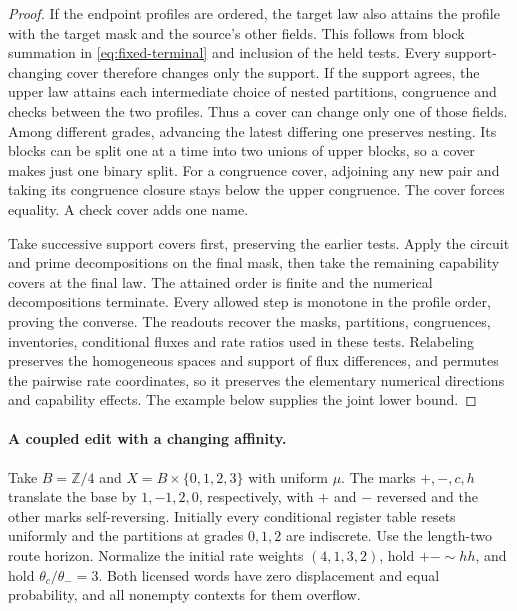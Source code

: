 \begin{proof}
If the endpoint profiles are ordered, the target law also attains
the profile with the target mask and the source's other fields.
This follows from block summation in \eqref{eq:fixed-terminal} and
inclusion of the held tests. Every support-changing cover therefore
changes only the support. If the support agrees, the upper law
attains each intermediate choice of nested partitions, congruence
and checks between the two profiles. Thus a cover can change only
one of those fields. Among different grades, advancing the latest
differing one preserves nesting. Its blocks can be split one at a
time into two unions of upper blocks, so a cover makes just one
binary split. For a congruence cover, adjoining any new pair and
taking its congruence closure stays below the upper congruence.
The cover forces equality. A check cover adds one name.

Take successive support covers first, preserving the earlier tests.
Apply the circuit and prime decompositions on the final mask, then
take the remaining capability covers at the final law. The attained
order is finite and the numerical decompositions terminate. Every
allowed step is monotone in the profile order, proving the converse.
The readouts recover the masks, partitions, congruences, inventories,
conditional fluxes and rate ratios used in these tests. Relabeling
preserves the homogeneous spaces and support of flux differences,
and permutes the pairwise rate coordinates, so it preserves the
elementary numerical directions and capability effects. The example
below supplies the joint lower bound.
\end{proof}

\paragraph{A coupled edit with a changing affinity.}
Take \(B=\mathbb Z/4\) and \(X=B\times\{0,1,2,3\}\) with uniform
\(\mu\). The marks \(+,-,c,h\) translate the base by \(1,-1,2,0\),
respectively, with \(+\) and \(-\) reversed and the other marks
self-reversing. Initially every conditional register table resets
uniformly and the partitions at grades \(0,1,2\) are indiscrete.
Use the length-two route horizon. Normalize the initial rate weights
\((4,1,3,2)\), hold \(+-\sim hh\), and hold
\(\theta_c/\theta_-=3\). Both licensed words have zero displacement
and equal probability, and all nonempty contexts for them overflow.

